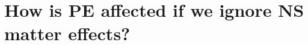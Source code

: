 \documentclass[aps,prd,amsmath,floats,floatfix, twocolumn,
superscriptaddress,nofootinbib,showpacs]{revtex4-1}
\newcommand{\lambdans}{\Lambda_\mathrm{NS}}
\newcommand{\chibh}{\chi_\mathrm{BH}}
\newcommand{\mbh}{m_\mathrm{BH}}
\newcommand{\mns}{m_\mathrm{NS}}
\newcommand{\mchirp}{\mathcal{M}_c}
\begin{document}
\section{How is PE affected if we ignore NS matter effects?}\label{s1:PEwithnoNS}
\end{document}
